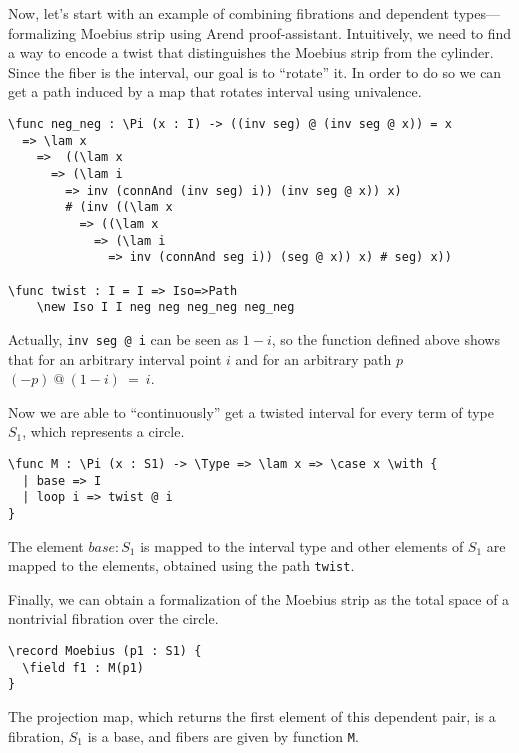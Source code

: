 Now, let's start with an example of combining fibrations and dependent types---formalizing Moebius strip using Arend proof-assistant.
Intuitively, we need to find a way to encode a twist that distinguishes the Moebius strip from the cylinder. Since the fiber is the interval, our goal is to ``rotate'' it. In order to do so we can get a path induced by a map that rotates interval using univalence. 
 
\begin{ListingEnv}[H]
\begin{lstlisting}
\func neg_neg : \Pi (x : I) -> ((inv seg) @ (inv seg @ x)) = x 
  => \lam x 
    =>  ((\lam x 
      => (\lam i 
        => inv (connAnd (inv seg) i)) (inv seg @ x)) x)
        # (inv ((\lam x 
          => ((\lam x 
            => (\lam i 
              => inv (connAnd seg i)) (seg @ x)) x) # seg) x))

\func twist : I = I => Iso=>Path
    \new Iso I I neg neg neg_neg neg_neg
\end{lstlisting}
\end{ListingEnv}

Actually, \texttt{inv seg @ i} can be seen as $1-i$, so the function defined above shows that for an arbitrary interval point $i$ and for an arbitrary path $p$ $(-p)\ @\ (1-i)\ =\ i$.

Now we are able to ``continuously'' get a twisted interval for every term of type $S_1$, which represents a circle.

\begin{ListingEnv}[H]
\begin{lstlisting}
\func M : \Pi (x : S1) -> \Type => \lam x => \case x \with {
  | base => I
  | loop i => twist @ i
}
\end{lstlisting}
\end{ListingEnv}

The element $base : S_1$ is mapped to the interval type and other elements of $S_1$ are mapped to the elements, obtained using the path \texttt{twist}.

Finally, we can obtain a formalization of the Moebius strip as the total space of a nontrivial fibration over the circle. 

\begin{ListingEnv}[H]
\begin{lstlisting}
\record Moebius (p1 : S1) {
  \field f1 : M(p1)
}
\end{lstlisting}
\end{ListingEnv}

The projection map, which returns the first element of this dependent pair, is a fibration, $S_1$ is a base, and fibers are given by function \texttt{M}.

